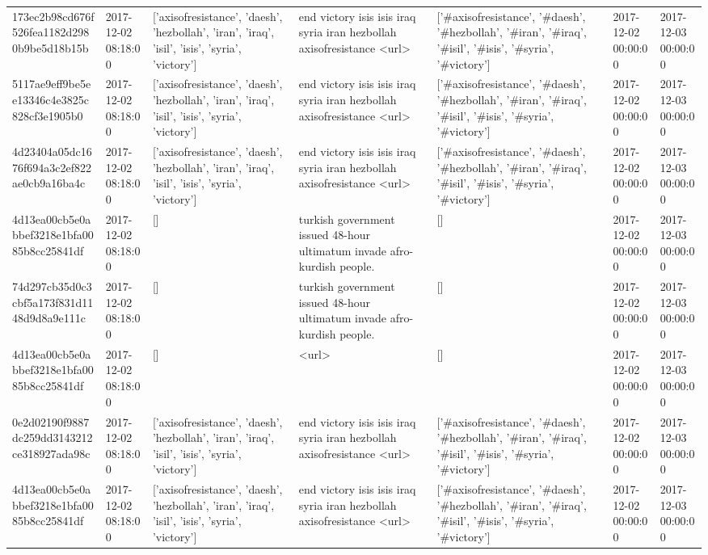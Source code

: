 \begin{tabular}{lllllll}
173ec2b98cd676f526fea1182d2980b9be5d18b15b & 2017-12-02 08:18:00 & ['axisofresistance', 'daesh', 'hezbollah', 'iran', 'iraq', 'isil', 'isis', 'syria', 'victory'] & end victory isis isis iraq syria iran hezbollah axisofresistance <url> & ['#axisofresistance', '#daesh', '#hezbollah', '#iran', '#iraq', '#isil', '#isis', '#syria', '#victory'] & 2017-12-02 00:00:00 & 2017-12-03 00:00:00 \\
5117ae9eff9be5ee13346c4e3825c828cf3e1905b0 & 2017-12-02 08:18:00 & ['axisofresistance', 'daesh', 'hezbollah', 'iran', 'iraq', 'isil', 'isis', 'syria', 'victory'] & end victory isis isis iraq syria iran hezbollah axisofresistance <url> & ['#axisofresistance', '#daesh', '#hezbollah', '#iran', '#iraq', '#isil', '#isis', '#syria', '#victory'] & 2017-12-02 00:00:00 & 2017-12-03 00:00:00 \\
4d23404a05dc1676f694a3c2ef822ae0cb9a16ba4c & 2017-12-02 08:18:00 & ['axisofresistance', 'daesh', 'hezbollah', 'iran', 'iraq', 'isil', 'isis', 'syria', 'victory'] & end victory isis isis iraq syria iran hezbollah axisofresistance <url> & ['#axisofresistance', '#daesh', '#hezbollah', '#iran', '#iraq', '#isil', '#isis', '#syria', '#victory'] & 2017-12-02 00:00:00 & 2017-12-03 00:00:00 \\
4d13ea00cb5e0abbef3218e1bfa0085b8cc25841df & 2017-12-02 08:18:00 & [] & turkish government issued 48-hour ultimatum invade afro-kurdish people. & [] & 2017-12-02 00:00:00 & 2017-12-03 00:00:00 \\
74d297cb35d0c3cbf5a173f831d1148d9d8a9e111c & 2017-12-02 08:18:00 & [] & turkish government issued 48-hour ultimatum invade afro-kurdish people. & [] & 2017-12-02 00:00:00 & 2017-12-03 00:00:00 \\
4d13ea00cb5e0abbef3218e1bfa0085b8cc25841df & 2017-12-02 08:18:00 & [] & <url> & [] & 2017-12-02 00:00:00 & 2017-12-03 00:00:00 \\
0e2d02190f9887dc259dd3143212ce318927ada98c & 2017-12-02 08:18:00 & ['axisofresistance', 'daesh', 'hezbollah', 'iran', 'iraq', 'isil', 'isis', 'syria', 'victory'] & end victory isis isis iraq syria iran hezbollah axisofresistance <url> & ['#axisofresistance', '#daesh', '#hezbollah', '#iran', '#iraq', '#isil', '#isis', '#syria', '#victory'] & 2017-12-02 00:00:00 & 2017-12-03 00:00:00 \\
4d13ea00cb5e0abbef3218e1bfa0085b8cc25841df & 2017-12-02 08:18:00 & ['axisofresistance', 'daesh', 'hezbollah', 'iran', 'iraq', 'isil', 'isis', 'syria', 'victory'] & end victory isis isis iraq syria iran hezbollah axisofresistance <url> & ['#axisofresistance', '#daesh', '#hezbollah', '#iran', '#iraq', '#isil', '#isis', '#syria', '#victory'] & 2017-12-02 00:00:00 & 2017-12-03 00:00:00 \\

\end{tabular}
